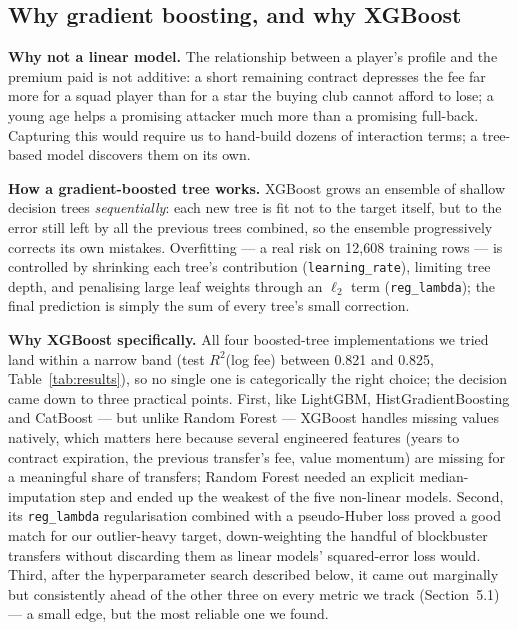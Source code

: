 \documentclass[11pt]{article}
\begin{document}
\subsection{Why gradient boosting, and why XGBoost}
\textbf{Why not a linear model.} The relationship between a player's profile
and the premium paid is not additive: a short remaining contract depresses
the fee far more for a squad player than for a star the buying club cannot
afford to lose; a young age helps a promising attacker much more than a
promising full-back. Capturing this would require us to hand-build dozens of
interaction terms; a tree-based model discovers them on its own.

\textbf{How a gradient-boosted tree works.} XGBoost grows an ensemble of
shallow decision trees \emph{sequentially}: each new tree is fit not to the
target itself, but to the error still left by all the previous trees
combined, so the ensemble progressively corrects its own mistakes. Overfitting
--- a real risk on 12{,}608 training rows --- is controlled by shrinking each
tree's contribution (\texttt{learning\_rate}), limiting tree depth, and
penalising large leaf weights through an $\ell_2$ term
(\texttt{reg\_lambda}); the final prediction is simply the sum of every
tree's small correction.

\textbf{Why XGBoost specifically.} All four boosted-tree implementations we
tried land within a narrow band (test $R^2$(log fee) between 0.821 and
0.825, Table~\ref{tab:results}), so no single one is categorically the right
choice; the decision came down to three practical points. First, like
LightGBM, HistGradientBoosting and CatBoost --- but unlike Random Forest ---
XGBoost handles missing values natively, which matters here because several
engineered features (years to contract expiration, the previous transfer's
fee, value momentum) are missing for a meaningful share of transfers;
Random Forest needed an explicit median-imputation step and ended up the
weakest of the five non-linear models. Second, its \texttt{reg\_lambda}
regularisation combined with a pseudo-Huber loss proved a good match for our
outlier-heavy target, down-weighting the handful of blockbuster transfers
without discarding them as linear models' squared-error loss would.
Third, after the hyperparameter search described below, it came out
marginally but consistently ahead of the other three on every metric we
track (Section~5.1) --- a small edge, but the most reliable one we found.
\end{document}
